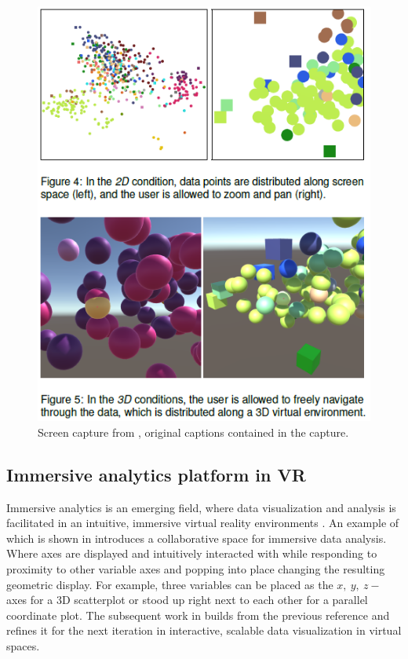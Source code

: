 \documentclass{monashthesis}
\begin{document}
\begin{figure}

{\centering \includegraphics[width=0.5\linewidth]{./figures/wagner18fig} 

}

\caption{Screen capture from
\textcite{wagner_filho_immersive_2018}, original captions contained in
the capture.}\label{fig:wagner18fig}
\end{figure}

\subsection{Immersive analytics platform in
VR}\label{immersive-analytics-platform-in-vr}

Immersive analytics is an emerging field, where data visualization and
analysis is facilitated in an intuitive, immersive virtual reality
environments
\autocites{chandler_immersive_2015}{cordeil_immersive_2017}. An example
of which is shown in \textcite{cordeil_imaxes:_2017} introduces a
collaborative space for immersive data analysis. Where axes are
displayed and intuitively interacted with while responding to proximity
to other variable axes and popping into place changing the resulting
geometric display. For example, three variables can be placed as the
\(x,~y,~z-\) axes for a 3D scatterplot or stood up right next to each
other for a parallel coordinate plot. The subsequent work in
\textcite{cordeil_immersive_2019} builds from the previous reference and
refines it for the next iteration in interactive, scalable data
visualization in virtual spaces.
\end{document}

